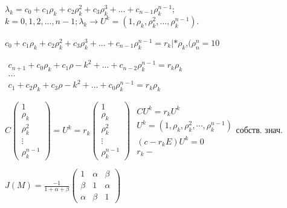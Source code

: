 \(
\lambda_k = c_0 + c_1\rho_k + c_2\rho_k^2 + c_3\rho_k^3 + ... +c_{n-1}\rho_k^{n-1}
\);\hspace{0.1cm}\(k = 0,1,2,...,n-1; 
\lambda_k \longrightarrow U^k = (1,\rho_k,\rho_k^2,...,\rho_k^{n-1}).\)
\newpage
\begin{center}
\(
 c_0 + c_1\rho_k + c_2\rho_k^2 + c_3\rho_k^3 + ... +c_{n-1}\rho_k^{n-1} = r_k  | *\rho_k
 \),\hspace{0.1cm}\((\rho_n^n = 10\)

\vspace{0.5cm}
\(
\begin{matrix}
	c_{n+1}+ c_0\rho_k + c_1\rho-k^2 + ... + c_{n-2}\rho_k^{n-1} = r_k\rho_k\\
	...\\
	c_1+ c_2\rho_k + c_3\rho-k^2 + ... + c_0\rho_k^{n-1} = r_k\rho_k
\end{matrix}
 \)

\end{center}
\vspace{0.5cm}
\(
C
	\begin{pmatrix}
		1\\ \rho_k \\ \rho_k^2 \\ \vdots \\ \rho_k^{n-1}
	\end{pmatrix}
	=U^k = 
	r_k
	\begin{pmatrix}
		1\\ \rho_k \\ \rho_k^2 \\ \vdots \\ \rho_k^{n-1}
	\end{pmatrix}
\)\hspace{1cm}
\(
	\begin{matrix}
		CU^k = r_kU^k \\
		U^k = (1, \rho_k, \rho_k^2, \cdots, \rho_k^{n-1}) \\
		(c - r_kE)U^k = 0\\ 
		r_k - 
	\end{matrix}
\)собств. знач.

\vspace{0.5cm}

\(
J(M) 
=\frac{-1}{1+\alpha+\beta}
	\begin{pmatrix}
		1 & \alpha & \beta\\
		\beta & 1 & \alpha\\
		\alpha & \beta & 1
	\end{pmatrix}
\)


